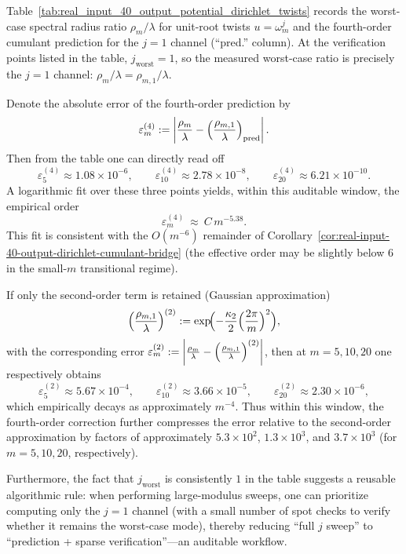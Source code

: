 \begin{remark}\label{rem:real-input-40-dirichlet-cumulant-error-order}
Table~\ref{tab:real_input_40_output_potential_dirichlet_twists} records the worst-case spectral radius ratio \(\rho_m/\lambda\) for unit-root twists \(u=\omega_m^j\) and the fourth-order cumulant prediction for the \(j=1\) channel (``pred.'' column).
At the verification points listed in the table, \(j_{\mathrm{worst}}=1\), so the measured worst-case ratio is precisely the \(j=1\) channel: \(\rho_m/\lambda=\rho_{m,1}/\lambda\).
\par
\noindent Denote the absolute error of the fourth-order prediction by
\[
\varepsilon_m^{(4)}:=\left\lvert\frac{\rho_m}{\lambda}-\Bigl(\frac{\rho_{m,1}}{\lambda}\Bigr)_{\mathrm{pred}}\right\rvert.
\]
Then from the table one can directly read off
\[
\varepsilon_{5}^{(4)}\approx 1.08\times 10^{-6},\qquad
\varepsilon_{10}^{(4)}\approx 2.78\times 10^{-8},\qquad
\varepsilon_{20}^{(4)}\approx 6.21\times 10^{-10}.
\]
A logarithmic fit over these three points yields, within this auditable window, the empirical order
\[
\varepsilon_m^{(4)}\ \approx\ C\,m^{-5.38}.
\]
This fit is consistent with the \(O(m^{-6})\) remainder of Corollary~\ref{cor:real-input-40-output-dirichlet-cumulant-bridge} (the effective order may be slightly below \(6\) in the small-\(m\) transitional regime).
\par
\noindent If only the second-order term is retained (Gaussian approximation)
\[
\Bigl(\frac{\rho_{m,1}}{\lambda}\Bigr)^{(2)}
:=\exp\!\Bigl(
-\frac{\kappa_2}{2}\Bigl(\frac{2\pi}{m}\Bigr)^2
\Bigr),
\]
with the corresponding error \(\varepsilon_m^{(2)}:=\left\lvert\frac{\rho_m}{\lambda}-\Bigl(\frac{\rho_{m,1}}{\lambda}\Bigr)^{(2)}\right\rvert\), then at \(m=5,10,20\) one respectively obtains
\[
\varepsilon_{5}^{(2)}\approx 5.67\times 10^{-4},\qquad
\varepsilon_{10}^{(2)}\approx 3.66\times 10^{-5},\qquad
\varepsilon_{20}^{(2)}\approx 2.30\times 10^{-6},
\]
which empirically decays as approximately \(m^{-4}\).
Thus within this window, the fourth-order correction further compresses the error relative to the second-order approximation by factors of approximately \(5.3\times10^2\), \(1.3\times10^3\), and \(3.7\times10^3\) (for \(m=5,10,20\), respectively).
\par
\noindent Furthermore, the fact that \(j_{\mathrm{worst}}\) is consistently \(1\) in the table suggests a reusable algorithmic rule: when performing large-modulus sweeps, one can prioritize computing only the \(j=1\) channel (with a small number of spot checks to verify whether it remains the worst-case mode), thereby reducing ``full \(j\) sweep'' to ``prediction + sparse verification''---an auditable workflow.
\end{remark}

